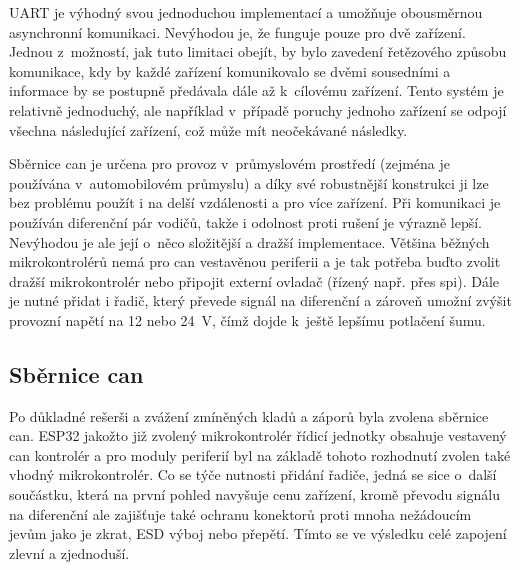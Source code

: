         UART je výhodný svou jednoduchou implementací a umožňuje obousměrnou asynchronní komunikaci. Nevýhodou je, že funguje pouze pro dvě zařízení. Jednou z~možností, jak tuto limitaci obejít, by bylo zavedení řetězového způsobu komunikace, kdy by každé zařízení komunikovalo se dvěmi sousedními a informace by se postupně předávala dále až k~cílovému zařízení. Tento systém je relativně jednoduchý, ale například v~případě poruchy jednoho zařízení se odpojí všechna následující zařízení, což může mít neočekávané následky.

        Sběrnice \acs{can} je určena pro provoz v~průmyslovém prostředí (zejména je používána v~automobilovém průmyslu) a díky své robustnější konstrukci ji lze bez problému použít i na delší vzdálenosti a pro více zařízení. Při komunikaci je používán diferenční pár vodičů, takže i odolnost proti rušení je výrazně lepší. Nevýhodou je ale její o~něco složitější a dražší implementace. Většina běžných mikrokontrolérů nemá pro \acs{can} vestavěnou periferii a je tak potřeba buďto zvolit dražší mikrokontrolér nebo připojit externí ovladač (řízený např. přes \acs{spi}). Dále je nutné přidat i řadič, který převede signál na diferenční a zároveň umožní zvýšit provozní napětí na 12  nebo \qty{24}{V}, čímž dojde k~ještě lepšímu potlačení šumu.

    \subsection{Sběrnice \acs{can}}
        Po důkladné rešerši a zvážení zmíněných kladů a záporů byla  zvolena sběrnice \acs{can}. ESP32 jakožto již zvolený mikrokontrolér řídicí jednotky obsahuje vestavený \acs{can} kontrolér a pro moduly periferií byl na základě tohoto rozhodnutí zvolen také vhodný mikrokontrolér. Co se týče nutnosti přidání řadiče, jedná se sice o~další součástku, která na první pohled navyšuje cenu zařízení, kromě převodu signálu na diferenční ale zajišťuje také ochranu konektorů proti mnoha nežádoucím jevům jako je zkrat, ESD výboj nebo přepětí. Tímto se ve výsledku celé zapojení zlevní a zjednoduší.


   
